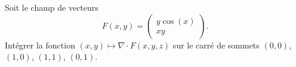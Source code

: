
\begin{exercice}\label{exoOutilsMath-0109}

    Soit le champ de vecteurs 
    \begin{equation}
        F(x,y)=\begin{pmatrix}
            y\cos(x)    \\ 
            xy    
        \end{pmatrix}.
    \end{equation}
    Intégrer la fonction $(x,y)\mapsto\nabla\cdot F(x,y,z)$ sur le carré de sommets $(0,0)$, $(1,0)$, $(1,1)$, $(0,1)$.

\end{exercice}
